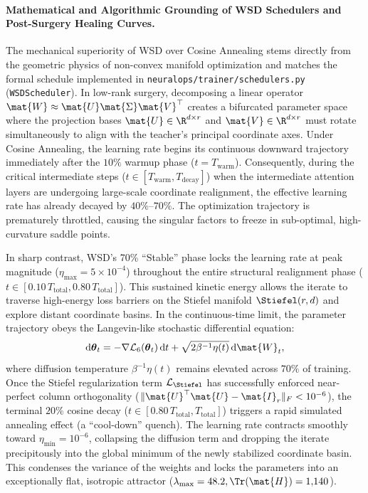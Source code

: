 \paragraph{Mathematical and Algorithmic Grounding of WSD Schedulers and Post-Surgery Healing Curves.}
The mechanical superiority of WSD over Cosine Annealing stems directly from the geometric physics of non-convex manifold optimization and matches the formal schedule implemented in \texttt{neuralops/trainer/schedulers.py} (\texttt{WSDScheduler}). In low-rank surgery, decomposing a linear operator $\mat{W} \approx \mat{U}\mat{\Sigma}\mat{V}^\top$ creates a bifurcated parameter space where the projection bases $\mat{U} \in \R^{d \times r}$ and $\mat{V} \in \R^{d \times r}$ must rotate simultaneously to align with the teacher's principal coordinate axes. Under Cosine Annealing, the learning rate begins its continuous downward trajectory immediately after the $10\%$ warmup phase ($t = T_{\text{warm}}$). Consequently, during the critical intermediate steps ($t \in [T_{\text{warm}}, T_{\text{decay}}]$) when the intermediate attention layers are undergoing large-scale coordinate realignment, the effective learning rate has already decayed by $40\%\text{--}70\%$. The optimization trajectory is prematurely throttled, causing the singular factors to freeze in sub-optimal, high-curvature saddle points.

In sharp contrast, WSD's 70\% ``Stable'' phase locks the learning rate at peak magnitude ($\eta_{\max} = 5 \times 10^{-4}$) throughout the entire structural realignment phase ($t \in [0.10\,T_{\text{total}}, 0.80\,T_{\text{total}}]$). This sustained kinetic energy allows the iterate to traverse high-energy loss barriers on the Stiefel manifold $\Stiefel(r, d)$ and explore distant coordinate basins. In the continuous-time limit, the parameter trajectory obeys the Langevin-like stochastic differential equation:
\begin{equation}
\mathrm{d}\boldsymbol{\theta}_t = -\nabla \mathcal{L}_6(\boldsymbol{\theta}_t)\,\mathrm{d}t + \sqrt{2 \beta^{-1} \eta(t)}\,\mathrm{d}\mat{W}_t,
\label{eq:wsd_langevin}
\end{equation}
where diffusion temperature $\beta^{-1} \eta(t)$ remains elevated across $70\%$ of training. Once the Stiefel regularization term $\mathcal{L}_{\Stiefel}$ has successfully enforced near-perfect column orthogonality ($\|\mat{U}^\top \mat{U} - \mat{I}_r\|_F < 10^{-6}$), the terminal $20\%$ cosine decay ($t \in [0.80\,T_{\text{total}}, T_{\text{total}}]$) triggers a rapid simulated annealing effect (a ``cool-down'' quench). The learning rate contracts smoothly toward $\eta_{\min} = 10^{-6}$, collapsing the diffusion term and dropping the iterate precipitously into the global minimum of the newly stabilized coordinate basin. This condenses the variance of the weights and locks the parameters into an exceptionally flat, isotropic attractor ($\lambda_{\max} = 48.2, \Tr(\mat{H}) = 1{,}140$).


